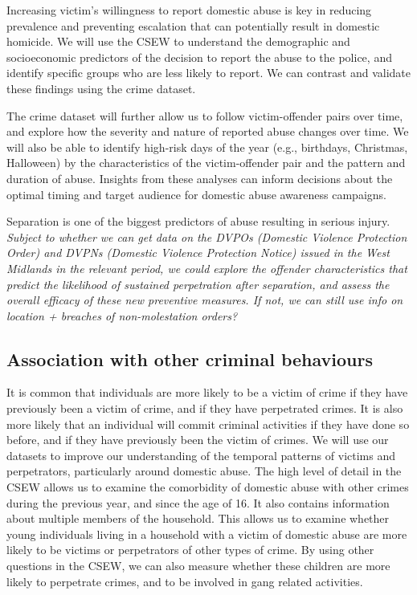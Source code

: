 \documentclass[12pt, letterpaper]{article}
\begin{document}
Increasing victim's willingness to report domestic abuse is key in reducing prevalence and preventing escalation that can potentially result in domestic homicide. We will use the CSEW to understand the demographic and socioeconomic predictors of the decision to report the abuse to the police, and identify specific groups who are less likely to report. We can contrast and validate these findings using the crime dataset.


The crime dataset will further allow us to follow victim-offender pairs over time, and explore how the severity and nature of reported abuse changes over time. We will also be able to identify high-risk days of the year (e.g., birthdays, Christmas, Halloween) by the characteristics of the victim-offender pair and the pattern and duration of abuse. Insights from these analyses can inform decisions about the optimal timing and target audience for domestic abuse awareness campaigns. 

Separation is one of the biggest predictors of abuse resulting in serious injury. \textit{Subject to whether we can get data on the DVPOs (Domestic Violence Protection Order) and DVPNs (Domestic Violence Protection Notice) issued in the West Midlands in the relevant period, we could explore the offender characteristics that predict the likelihood of sustained perpetration after separation, and assess the overall efficacy of these new preventive measures. If not, we can still use info on location + breaches of non-molestation orders?}



\subsection{Association with other criminal behaviours}

It is common that individuals are more likely to be a victim of crime if they have previously been a victim of crime, and if they have perpetrated crimes. It is also more likely that an individual will commit criminal activities if they have done so before, and if they have previously been the victim of crimes. We will use our datasets to improve our understanding of the temporal patterns of victims and perpetrators, particularly around domestic abuse. The high level of detail in the CSEW allows us to examine the comorbidity of domestic abuse with other crimes during the previous year, and since the age of 16. It also contains information about  multiple members of the household. This allows us to examine whether young individuals living in a household with a victim of domestic abuse are more likely to be victims or perpetrators of other types of crime. By using other questions in the CSEW, we can also measure whether these children are more likely to perpetrate crimes, and to be involved in gang related activities.
\end{document}
